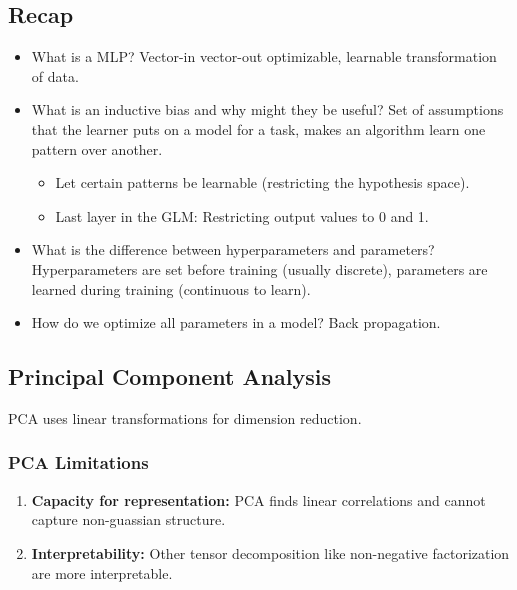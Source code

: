 \documentclass{article}
\begin{document}
\subsection{Recap}
\begin{summary}
    \begin{itemize}
        \item What is a MLP? Vector-in vector-out optimizable, learnable transformation of data.
        \item What is an inductive bias and why might they be useful? Set of assumptions that the learner puts on a model for a task, makes an algorithm learn one pattern over another.
        \begin{itemize}
            \item Let certain patterns be learnable (restricting the hypothesis space).
            \item Last layer in the GLM: Restricting output values to 0 and 1. 
        \end{itemize}
        \item What is the difference between hyperparameters and parameters? Hyperparameters are set before training (usually discrete), parameters are learned during training (continuous to learn).
        \item How do we optimize all parameters in a model? Back propagation.
    \end{itemize}
\end{summary}

\subsection{Principal Component Analysis}
\begin{definition}
    PCA uses linear transformations for dimension reduction.
\end{definition}

\subsubsection{PCA Limitations}
\begin{definition}
    \begin{enumerate}
        \item \textbf{Capacity for representation:} PCA finds linear correlations and cannot capture non-guassian structure.
        \item \textbf{Interpretability:} Other tensor decomposition like non-negative factorization are more interpretable.
    \end{enumerate}
\end{definition}
\end{document}
